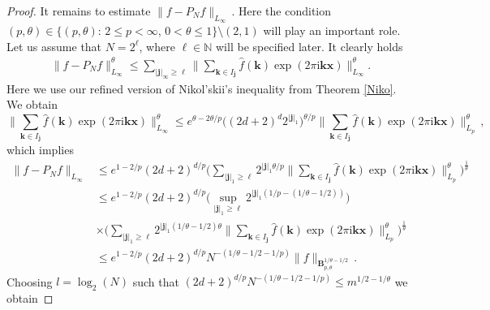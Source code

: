\documentclass[11pt,reqno]{article}
\numberwithin{equation}{section}
\theoremstyle{definition}
\theoremstyle{plain}
\newcommand{\N}{\ensuremath{\mathbb{N}}}
\newcommand{\bk}{\ensuremath{\mathbf k}}
\newcommand{\bj}{\ensuremath{\mathbf j}}
\newcommand{\bx}{\ensuremath{\mathbf x}}
\begin{document}
\begin{proof}
 It remains to estimate $\|f-P_Nf\|_{L_\infty}$\,. Here the condition $(p,\theta)\in \{(p,\theta) : \, 2\leq p<\infty$, $0<\theta\leq 1\} \setminus (2,1)$ will play an important role. Let us assume that $N = 2^\ell$, where $\ell\in\N$ will be specified later. It clearly holds
\begin{equation}
    \begin{split}
        \|f-P_Nf\|_{L_\infty}^{\theta} \leq \sum\limits_{|\bj|_\infty \geq \ell} \Big\|\sum_{\bk \in I_{\bj}}\hat{f}(\bk)\exp(2\pi \mathrm{i} \bk \bx)\Big\|_{L_\infty}^{\theta} .
    \end{split}
\end{equation}
Here we use our refined version of Nikol'skii's inequality from Theorem \ref{Niko}. We obtain
$$
    \Big\|\sum_{\bk \in I_{\bj}}\hat{f}(\bk)\exp(2\pi \mathrm{i} \bk \bx)\Big\|_{L_\infty}^{\theta} \leq 
    e^{\theta - 2\theta/p} \big((2d+2)^d2^{|\bj|_1}\big)^{\theta/p}\Big\|\sum_{\bk \in I_{\bj}}\hat{f}(\bk)\exp(2\pi \mathrm{i} \bk \bx)\Big\|_{L_p}^{\theta}\,, 
$$
which implies 
\begin{equation}\label{eq100}
    \begin{split}
        \|f-P_Nf\|_{L_\infty}
        &
        \leq e^{1 - 2/p} (2d+2)^{d/p} \bigg( \sum\limits_{|\bj|_1 \geq \ell} 2^{|\bj|_1 \theta/p}
        \Big\|\sum_{\bk \in I_{\bj}}\hat{f}(\bk)\exp(2\pi \mathrm{i} \bk \bx)\Big\|_{L_p}^{\theta} \bigg)^{\frac{1}{\theta}}\\
        &\leq e^{1 - 2/p} (2d+2)^{d/p} \Big(\sup\limits_{|\bj|_1 \geq \ell}2^{|\bj|_1(1/p-(1/\theta-1/2))}\Big) \\
        &\times
        \bigg(\sum\limits_{\vert \bj\vert_1 \geq \ell}2^{\vert \bj\vert_1(1/\theta-1/2)\theta}
        \Big\|\sum_{\bk \in I_{\bj}}\hat{f}(\bk)\exp(2\pi \mathrm{i} \bk \bx)\Big\|_{L_p}^{\theta} \bigg)^{\frac{1}{\theta}} \\
        &\leq e^{1 - 2/p} (2d+2)^{d/p}N^{-(1/\theta-1/2-1/p)}\|f\|_{\mathbf{B}^{1/\theta-1/2}_{p,\theta}}\,.
    \end{split}
\end{equation} 
Choosing $l=\log_2(N)$ such that $(2d+2)^{d/p} N^{-(1/\theta-1/2-1/p)} \leq m^{1/2-1/\theta}$ we obtain 

\end{proof}
\end{document}
